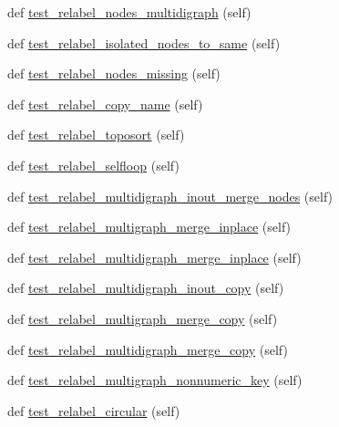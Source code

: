 \begin{DoxyCompactItemize}
\item 
def \hyperlink{classnetworkx_1_1tests_1_1test__relabel_1_1TestRelabel_aaabd603ebb8c3d33b9876417567d87ca}{test\+\_\+relabel\+\_\+nodes\+\_\+multidigraph} (self)
\item 
def \hyperlink{classnetworkx_1_1tests_1_1test__relabel_1_1TestRelabel_a275bc3ec6d2f15ada942723ef1092761}{test\+\_\+relabel\+\_\+isolated\+\_\+nodes\+\_\+to\+\_\+same} (self)
\item 
def \hyperlink{classnetworkx_1_1tests_1_1test__relabel_1_1TestRelabel_a004c217a820c72bb7c1cd7bfe1734b83}{test\+\_\+relabel\+\_\+nodes\+\_\+missing} (self)
\item 
def \hyperlink{classnetworkx_1_1tests_1_1test__relabel_1_1TestRelabel_a6002e32325d2fc66d67a40494dd6488b}{test\+\_\+relabel\+\_\+copy\+\_\+name} (self)
\item 
def \hyperlink{classnetworkx_1_1tests_1_1test__relabel_1_1TestRelabel_aec0f8c0bbc66da9294dc3a4583fe5b3e}{test\+\_\+relabel\+\_\+toposort} (self)
\item 
def \hyperlink{classnetworkx_1_1tests_1_1test__relabel_1_1TestRelabel_a6afec634633cdd404c0aee2c38d39c03}{test\+\_\+relabel\+\_\+selfloop} (self)
\item 
def \hyperlink{classnetworkx_1_1tests_1_1test__relabel_1_1TestRelabel_aa34c8bc4fa841c7b274f4d2ff5fd8267}{test\+\_\+relabel\+\_\+multidigraph\+\_\+inout\+\_\+merge\+\_\+nodes} (self)
\item 
def \hyperlink{classnetworkx_1_1tests_1_1test__relabel_1_1TestRelabel_a1c23efb6b199e9e791a1cb8fcf8dd899}{test\+\_\+relabel\+\_\+multigraph\+\_\+merge\+\_\+inplace} (self)
\item 
def \hyperlink{classnetworkx_1_1tests_1_1test__relabel_1_1TestRelabel_afb55a6e073a4b5c92e2a124db888c862}{test\+\_\+relabel\+\_\+multidigraph\+\_\+merge\+\_\+inplace} (self)
\item 
def \hyperlink{classnetworkx_1_1tests_1_1test__relabel_1_1TestRelabel_aa8a3667f2ad6003ee3f84901b448e438}{test\+\_\+relabel\+\_\+multidigraph\+\_\+inout\+\_\+copy} (self)
\item 
def \hyperlink{classnetworkx_1_1tests_1_1test__relabel_1_1TestRelabel_a505be516d180ff5b5444738958f5d04a}{test\+\_\+relabel\+\_\+multigraph\+\_\+merge\+\_\+copy} (self)
\item 
def \hyperlink{classnetworkx_1_1tests_1_1test__relabel_1_1TestRelabel_a0abced7c85c697b6744b3394d55f9cef}{test\+\_\+relabel\+\_\+multidigraph\+\_\+merge\+\_\+copy} (self)
\item 
def \hyperlink{classnetworkx_1_1tests_1_1test__relabel_1_1TestRelabel_ac2a92f939870b0a2dec8e979bb104914}{test\+\_\+relabel\+\_\+multigraph\+\_\+nonnumeric\+\_\+key} (self)
\item 
def \hyperlink{classnetworkx_1_1tests_1_1test__relabel_1_1TestRelabel_a1cf73eab5459b4d077b79c35e95e2a4c}{test\+\_\+relabel\+\_\+circular} (self)
\end{DoxyCompactItemize}


